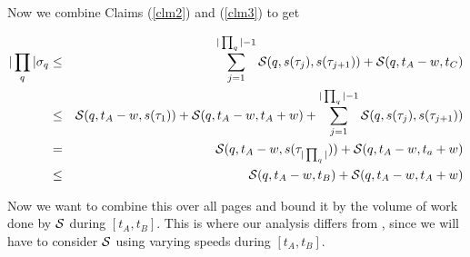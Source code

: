 \documentclass[11pt]{article}
\newcommand{\cS}{{\cal S}}
\begin{document}
Now we combine Claims (\ref{clm2}) and (\ref{clm3}) to get

\begin{eqnarray*}
|\prod_q|\sigma_q &\leq& \sum_{j=1}^{|\prod_q|-1} \cS(q,s(\tau_j),s(\tau_{j+1})) + \cS(q,t_A - w, t_C) \\
&\leq& \cS(q,t_A - w, s(\tau_1)) +  \cS(q,t_A - w, t_A+w) +\sum_{j=1}^{|\prod_q|-1} \cS(q,s(\tau_j),s(\tau_{j+1})) \\
&= &  \cS(q,t_A - w, s(\tau_{|\prod_q|})) +  \cS(q,t_A - w, t_a+w) \\
&\leq&  \cS(q,t_A - w, t_B) +  \cS(q,t_A - w, t_A+w)
\end{eqnarray*}

Now we want to combine this over all pages and bound it by the volume of work done by $\cS$ during $[t_A,t_B]$.  This is where our analysis differs from \cite{BansalKN09}, since we will have to consider $\cS$ using varying speeds during $[t_A,t_B]$.

\fi
\end{document}
